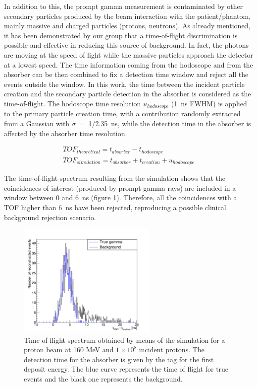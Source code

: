 In addition to this, the prompt gamma measurement is contaminated by other secondary particles produced by the beam interaction with the patient/phantom, mainly massive and charged particles (protons, neutrons). 
As already mentioned, it has been demonstrated by our group that a time-of-flight discrimination is possible and effective in reducing this source of background. In fact, the photons are moving at the speed of light while the massive particles approach the detector at a lowest speed. The time information coming from the hodoscope and from the absorber can be then combined to fix a detection time window and reject all the events outside the window. In this work, the time between the incident particle creation and the secondary particle detection in the absorber is considered as the time-of-flight. The hodoscope time resolution $u_{hodoscope}$ (1~ns FWHM) is applied to the primary particle creation time, with a contribution randomly extracted from a Gaussian with $\sigma\,=$ 1/2.35~ns, while the detection time in the absorber is affected by the absorber time resolution.

 \begin{eqnarray}
TOF_{theoretical} = t_{absorber}-t_{hodoscope} \\
TOF_{simulation} = t_{absorber}+t_{creation} + u_{hodoscope}
\label{TOF_equation}
\end{eqnarray} 

The time-of-flight spectrum resulting from the simulation shows that the coincidences of interest (produced by prompt-gamma rays) are included in a window between 0 and 6~ns (figure \ref{fig:fig_TOF_distribution_CC_simulation_Hadronth}). Therefore, all the coincidences with a TOF higher than 6~ns have been rejected, reproducing a possible clinical background rejection scenario. 

\begin{figure} [!hbtp]	
  \centering
  \includegraphics[width=0.6\textwidth]{./Figure/2015_01_04_TOF_spectra_NoCut_1Proton_ResolTemporelle_applied_these.jpg}
  \caption{Time of flight spectrum obtained by means of the simulation for a proton beam at 160 MeV and $1\times10^{8}$ incident protons. The detection time for the absorber is given by the tag for the first deposit energy. The blue curve represents the time of flight for true events and the black one represents the background.}	
  \label{fig:fig_TOF_distribution_CC_simulation_Hadronth}
\end{figure}

